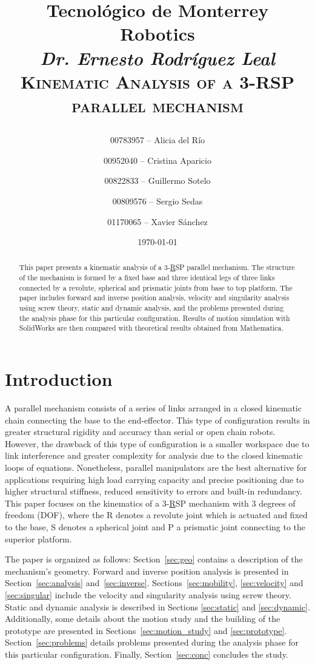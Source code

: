 \documentclass[titlepage, letterpaper]{article}
\title{
\vspace{1in}
\textbf{Tecnológico de Monterrey} \\
\vspace{0.5in}
\textmd{Robotics} \\
\large{\textit{Dr. Ernesto Rodríguez Leal}} \\
\vspace{0.5in}
\textsc{Kinematic Analysis of a 3-RSP parallel mechanism}\\
\author{00783957 -- Alicia del Río \\
\and 00952040 -- Cristina Aparicio \\
\and 00822833 -- Guillermo Sotelo \\
\and 00809576 -- Sergio Sedas \\
\and 01170065 -- Xavier Sánchez}
\date{\today}
}
\begin{document}
\maketitle

\begin{abstract}
This paper presents a kinematic analysis of a 3-\underline{R}SP parallel mechanism.
The structure of the mechanism is formed by a fixed base and three identical legs of three links connected by a revolute, spherical and prismatic joints from base to top platform.
The paper includes forward and inverse position analysis, velocity and singularity analysis using screw theory, static and dynamic analysis, and the problems presented during the analysis phase for this particular configuration.
Results of motion simulation with SolidWorks are then compared with theoretical results obtained from Mathematica.
\end{abstract}


\section{Introduction}
\label{sec:intro}

A parallel mechanism consists of a series of links arranged in a closed kinematic chain connecting the base to the end-effector.
This type of configuration results in greater structural rigidity and accuracy than serial or open chain robots.
However, the drawback of this type of configuration is a smaller workspace due to link interference and greater complexity for analysis due to the closed kinematic loops of equations.
Nonetheless, parallel manipulators are the best alternative for applications requiring high load carrying capacity and precise positioning due to higher structural stiffness, reduced sensitivity to errors and built-in redundancy.
This paper focuses on the kinematics of a 3-\underline{R}SP mechanism with 3 degrees of freedom (DOF), where the R denotes a revolute joint which is actuated and fixed to the base, S denotes a spherical joint and P a prismatic joint connecting to the superior platform.

The paper is organized as follows:
Section~\ref{sec:geo} contains a description of the mechanism's geometry.
Forward and inverse position analysis is presented in Section~\ref{sec:analysis} and~\ref{sec:inverse}.
Sections~\ref{sec:mobility}, \ref{sec:velocity} and \ref{sec:singular} include the velocity and singularity analysis using screw theory.
Static and dynamic analysis is described in Sections \ref{sec:static} and \ref{sec:dynamic}.
Additionally, some details about the motion study and the building of the prototype are presented in Sections~\ref{sec:motion_study} and \ref{sec:prototype}.
Section~\ref{sec:problems} details problems presented during the analysis phase for this particular configuration.
Finally, Section~\ref{sec:conc} concludes the study.
\end{document}
